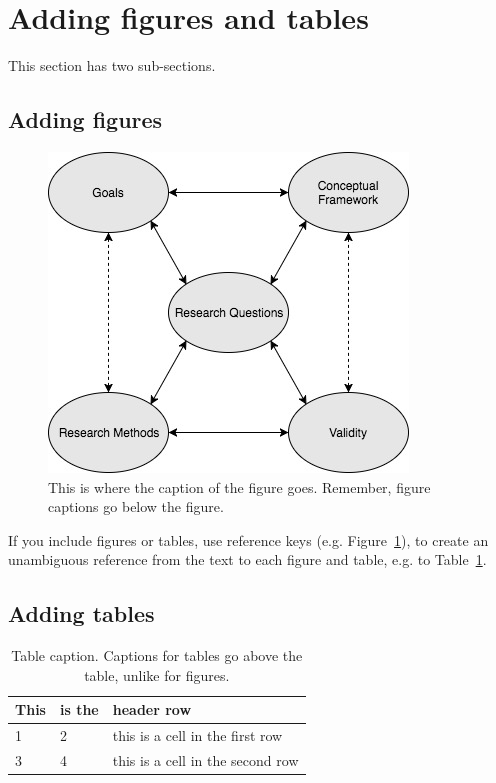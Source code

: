 \documentclass{dhbenelux}
\begin{document}
\section{Adding figures and tables}

This section has two sub-sections.

\subsection{Adding figures}

\begin{figure}
\begin{center}
\includegraphics[width=0.6\linewidth]{Images/Maxwell-conceptual-model.jpg}
\end{center}
\caption{This is where the caption of the figure goes. Remember, figure captions go below the figure.}
\label{fig:model_maxwell}
\end{figure}

If you include figures or tables, use reference keys (e.g. Figure~\ref{fig:model_maxwell}), to create an unambiguous reference from the text to each figure and table, e.g. to Table~\ref{tab:groups}.


\subsection{Adding tables}

\begin{table}[tbp!]
\centering
\caption{Table caption. Captions for tables go above the table, unlike for figures.}
\label{tab:groups}
\begin{tabular}{| l | l | l |}
\toprule
 This   & is the  & header row \\
\midrule
 1 & 2 & this is a cell in the first row \\
 3 & 4 & this is a cell in the second row \\
\bottomrule
\end{tabular}
\end{table}




\end{document}
